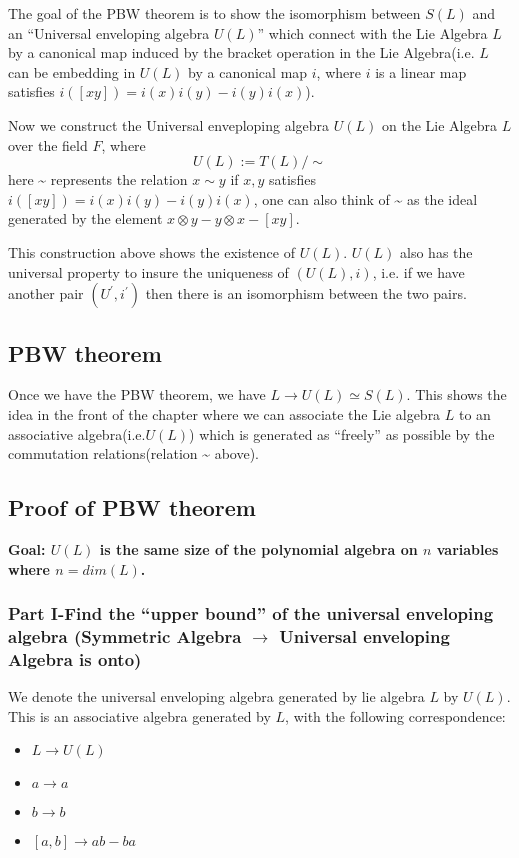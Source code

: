 \documentclass[11pt]{article}
\begin{document}
The goal of the PBW theorem is to show the isomorphism between \(S(L)\) and an ``Universal enveloping algebra \(U(L)\)'' which connect with the Lie Algebra \(L\) by a canonical map induced by the bracket operation in the Lie Algebra(i.e. \(L\) can be embedding in \(U(L)\) by a canonical map \(i\), where \(i\) is a linear map satisfies \(i([xy]) = i(x)i(y) - i(y)i(x)\)).

Now we construct the Universal enveploping algebra \(U(L)\) on the Lie Algebra \(L\) over the field \(F\), where
\[
U(L):= T(L)/\sim
\]
here \textasciitilde{} represents the relation \(x \sim y\) if \(x,y\) satisfies \(i([xy]) = i(x)i(y) - i(y)i(x)\), one can also think of \textasciitilde{} as the ideal generated by the element \(x \otimes y - y \otimes x - [xy]\).

This construction above shows the existence of \(U(L)\). \(U(L)\) also has the universal property to insure the uniqueness of \((U(L),i)\), i.e. if we have another pair \((U^{\prime},i^{\prime})\) then there is an isomorphism between the two pairs.
\subsection{PBW theorem}
\label{sec:orgdef6f5c}
Once we have the PBW theorem, we have \(L \to U(L) \simeq S(L)\). This shows the idea in the front of the chapter where we can associate the Lie algebra \(L\) to an associative algebra(i.e.\(U(L)\)) which is generated as ``freely'' as possible by the commutation relations(relation \textasciitilde{} above).
\subsection{Proof of PBW theorem}
\label{sec:org01c5105}
\textbf{Goal: \(U(L)\) is the same size of the polynomial algebra on \(n\) variables where \(n = dim(L)\).}
\subsubsection{Part I-Find the ``upper bound'' of the universal enveloping algebra (Symmetric Algebra \(\to\) Universal enveloping Algebra is onto)}
\label{sec:org8784baf}

\begin{definition}
We denote the universal enveloping algebra generated by lie algebra \(L\) by \(U(L)\). This is an associative algebra generated by \(L\), with the following correspondence:
\begin{itemize}
\item \(L \to U(L)\)
\item \(a \to a\)
\item \(b \to b\)
\item \([a,b] \to ab - ba\)
\end{itemize}
\end{definition}
\end{document}
